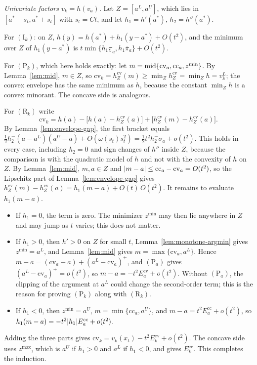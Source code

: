 \emph{Univariate factors $v_k=h(v_a)$.} Let $Z=[a^L,a^U]$, which lies in
$[a^*-s_t,a^*+s_t]$ with $s_t=Ct$, and let $h_1=h'(a^*)$, $h_2=h''(a^*)$.

For $(\mathrm I_k)$: on $Z$, $h(y)=h(a^*)+h_1(y-a^*)+O(t^2)$, and the minimum
over $Z$ of $h_1(y-a^*)$ is $t\min\{h_1\underline\pi_a,h_1\overline\pi_a\}+O(t^2)$.

For $(\mathrm P_k)$, which here holds exactly: let
$m=\operatorname{mid}\{\mathrm{cv}_a,\mathrm{cc}_a,z^{\min}\}$. By Lemma~\ref{lem:mid},
$m\in Z$, so $\mathrm{cv}_k=h^{\mathrm{cv}}_Z(m)\ge\min_Zh^{\mathrm{cv}}_Z=\min_Zh=v_k^L$;
the convex envelope has the same minimum as $h$, because the constant
$\min_Zh$ is a convex minorant. The concave side is analogous.

For $(\mathrm R_k)$ write
\[
  \mathrm{cv}_k=h(a)-\bigl[h(a)-h^{\mathrm{cv}}_Z(a)\bigr]
  +\bigl[h^{\mathrm{cv}}_Z(m)-h^{\mathrm{cv}}_Z(a)\bigr].
\]
By Lemma~\ref{lem:envelope-gap}, the first bracket equals
$\tfrac12h_2^-(a-a^L)(a^U-a)+O(\omega(s_t)s_t^2)=\tfrac12t^2h_2^-\sigma_a+o(t^2)$.
This holds in every case, including $h_2=0$ and sign changes of $h''$ inside
$Z$, because the comparison is with the quadratic model of $h$ and not with
the convexity of $h$ on $Z$. By Lemma~\ref{lem:mid}, $m,a\in Z$ and
$\lvert m-a\rvert\le\mathrm{cc}_a-\mathrm{cv}_a=O(t^2)$, so the Lipschitz part of
Lemma~\ref{lem:envelope-gap} gives
$h^{\mathrm{cv}}_Z(m)-h^{\mathrm{cv}}_Z(a)=h_1(m-a)+O(t)\,O(t^2)$. It remains to
evaluate $h_1(m-a)$.
\begin{itemize}
\item If $h_1=0$, the term is zero. The minimizer $z^{\min}$ may then lie
  anywhere in $Z$ and may jump as $t$ varies; this does not matter.
\item If $h_1>0$, then $h'>0$ on $Z$ for small $t$, Lemma~\ref{lem:monotone-argmin}
  gives $z^{\min}=a^L$, and Lemma~\ref{lem:mid} gives
  $m=\max\{\mathrm{cv}_a,a^L\}$. Hence
  $m-a=(\mathrm{cv}_a-a)+(a^L-\mathrm{cv}_a)^+$, and $(\mathrm P_a)$ gives
  $(a^L-\mathrm{cv}_a)^+=o(t^2)$, so $m-a=-t^2E_a^{\mathrm{cv}}+o(t^2)$. Without
  $(\mathrm P_a)$, the clipping of the argument at $a^L$ could change the
  second-order term; this is the reason for proving $(\mathrm P_k)$ along
  with $(\mathrm R_k)$.
\item If $h_1<0$, then $z^{\min}=a^U$, $m=\min\{\mathrm{cc}_a,a^U\}$, and
  $m-a=t^2E_a^{\mathrm{cc}}+o(t^2)$, so
  $h_1(m-a)=-t^2\lvert h_1\rvert E_a^{\mathrm{cc}}+o(t^2)$.
\end{itemize}
Adding the three parts gives $\mathrm{cv}_k=v_k(x_t)-t^2E_k^{\mathrm{cv}}+o(t^2)$.
The concave side uses $z^{\max}$, which is $a^U$ if $h_1>0$ and $a^L$ if
$h_1<0$, and gives $E_k^{\mathrm{cc}}$. This completes the induction.


